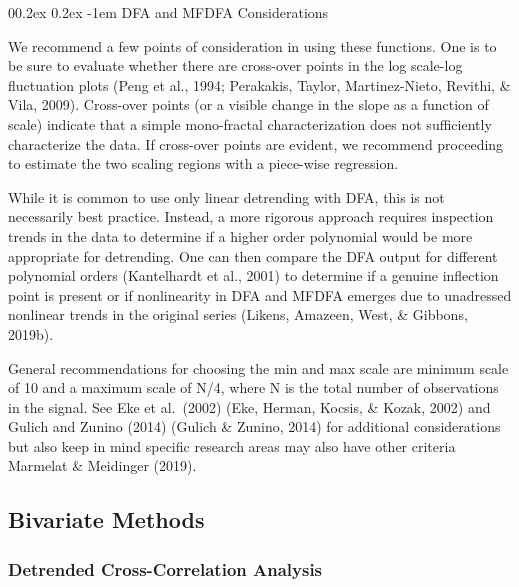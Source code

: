\documentclass[
  man]{apa6}
\makeatletter
\let\oldparagraph\paragraph
\renewcommand{\paragraph}[1]{\oldparagraph{#1}\mbox{}}
\renewcommand{\paragraph}{\@startsection{paragraph}{4}{\parindent}%
  {0\baselineskip \@plus 0.2ex \@minus 0.2ex}%
  {-1em}%
  {\normalfont\normalsize\bfseries\itshape\typesectitle}}
\makeatother
\begin{document}
\hypertarget{dfa-and-mfdfa-considerations}{%
\paragraph{DFA and MFDFA Considerations}\label{dfa-and-mfdfa-considerations}}

We recommend a few points of consideration in using these functions. One
is to be sure to evaluate whether there are cross-over points in the log
scale-log fluctuation plots (Peng et al., 1994; Perakakis, Taylor, Martinez-Nieto, Revithi, \& Vila, 2009). Cross-over points (or a visible change in the slope as
a function of scale) indicate that a simple mono-fractal
characterization does not sufficiently characterize the data. If
cross-over points are evident, we recommend proceeding to estimate the
two scaling regions with a piece-wise regression.

While it is common to use only linear detrending with DFA, this is not
necessarily best practice. Instead, a more rigorous approach requires
inspection trends in the data to determine if a higher order polynomial
would be more appropriate for detrending. One can then compare the DFA
output for different polynomial orders
(Kantelhardt et al., 2001) to determine if a
genuine inflection point is present or if nonlinearity in DFA and MFDFA
emerges due to unadressed nonlinear trends in the original series
(Likens, Amazeen, West, \& Gibbons, 2019b).

General recommendations for choosing the min and max scale are minimum
scale of 10 and a maximum scale of N/4, where N is the total number of
observations in the signal. See Eke et al.~(2002)
(Eke, Herman, Kocsis, \& Kozak, 2002) and Gulich and Zunino (2014)
(Gulich \& Zunino, 2014) for additional considerations
but also keep in mind specific research areas may also have other
criteria Marmelat \& Meidinger (2019).

\hypertarget{bivariate-methods}{%
\subsection{Bivariate Methods}\label{bivariate-methods}}

\hypertarget{detrended-cross-correlation-analysis}{%
\subsubsection{Detrended Cross-Correlation Analysis}\label{detrended-cross-correlation-analysis}}
\end{document}

